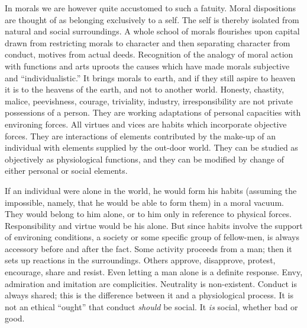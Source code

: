 \documentclass[12pt]{article}
\begin{document}
In morals we are however quite accustomed to such
a fatuity. Moral dispositions are thought of as belonging
exclusively to a self. The self is thereby isolated
from natural and social surroundings. A whole school
of morals flourishes upon capital drawn from restricting
morals to character and then separating character
from conduct, motives from actual deeds. Recognition
of the analogy of moral action with functions and arts
uproots the causes which have made morals subjective
and ``individualistic.'' It brings morals to earth, and
if they still aspire to heaven it is to the heavens of the
earth, and not to another world. Honesty, chastity,
malice, peevishness, courage, triviality, industry, irresponsibility
are not private possessions of a person.
They are working adaptations of personal capacities
with environing forces. All virtues and vices are habits
which incorporate objective forces. They are interactions
of elements contributed by the make-up of an
individual with elements supplied by the out-door world.
They can be studied as objectively as physiological
functions, and they can be modified by change of either
personal or social elements.

If an individual were alone in the world, he would
form his habits (assuming the impossible, namely, that
he would be able to form them) in a moral vacuum.
They would belong to him alone, or to him only in reference
to physical forces. Responsibility and virtue
would be his alone. But since habits involve the support
of environing conditions, a society or some specific
group of fellow-men, is always accessory before and
after the fact. Some activity proceeds from a man;
then it sets up reactions in the surroundings. Others
approve, disapprove, protest, encourage, share and resist.
Even letting a man alone is a definite response.
Envy, admiration and imitation are complicities. Neutrality
is non-existent. Conduct is always shared; this
is the difference between it and a physiological process.
It is not an ethical ``ought'' that conduct \emph{should} be
social. It \emph{is} social, whether bad or good.
\end{document}
